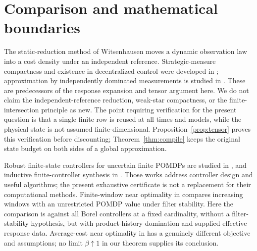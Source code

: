 \section{Comparison and mathematical boundaries}\label{sec:literature}
The static-reduction method of Witsenhausen \cite{Witsenhausen} moves a dynamic observation law into a cost density under an independent reference. Strategic-measure compactness and existence in decentralized control were developed in \cite{YukselSaldi,Yuksel}; approximation by independently dominated measurements is studied in \cite{Hogeboom}. These are predecessors of the response expansion and tensor argument here. We do not claim the independent-reference reduction, weak-star compactness, or the finite-intersection principle as new. The point requiring verification for the present question is that a single finite row is reused at all times and models, while the physical state is not assumed finite-dimensional. Proposition~\ref{prop:tensor} proves this verification before discounting; Theorem~\ref{thm:compile} keeps the original state budget on both sides of a global approximation.

Robust finite-state controllers for uncertain finite POMDPs are studied in \cite{Cubuktepe}, and inductive finite-controller synthesis in \cite{Andriushchenko}. Those works address controller design and useful algorithms; the present exhaustive certificate is not a replacement for their computational methods. Finite-window near optimality in \cite{Kara} compares increasing windows with an unrestricted POMDP value under filter stability. Here the comparison is against all Borel controllers at a fixed cardinality, without a filter-stability hypothesis, but with product-history domination and supplied effective response data. Average-cost near optimality in \cite{YuBertsekas} has a genuinely different objective and assumptions; no limit $\beta\uparrow1$ in our theorem supplies its conclusion.


